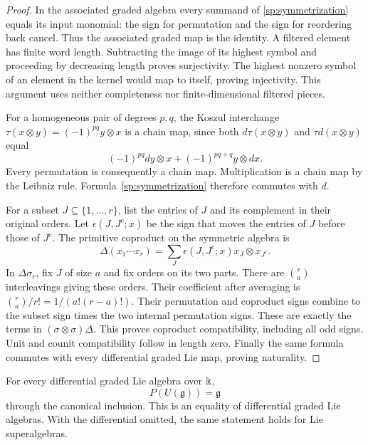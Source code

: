 \begin{proof}
In the associated graded algebra every summand of
\eqref{sp:symmetrization} equals its input monomial: the sign for
permutation and the sign for reordering back cancel.
Thus the associated graded map is the identity.  A filtered element
has finite word length.  Subtracting the image of its highest symbol
and proceeding by decreasing length proves surjectivity.
The highest nonzero symbol of an element in the kernel would map to
itself, proving injectivity.  This argument uses neither completeness
nor finite-dimensional filtered pieces.

For a homogeneous pair of degrees $p,q$, the Koszul interchange
$\tau(x\otimes y)=(-1)^{pq}y\otimes x$ is a chain map, since both
$d\tau(x\otimes y)$ and $\tau d(x\otimes y)$ equal
\[
 (-1)^{pq}dy\otimes x+(-1)^{pq+q}y\otimes dx.
\]
Every permutation is consequently a chain map.  Multiplication is a
chain map by the Leibniz rule.  Formula~\eqref{sp:symmetrization}
therefore commutes with $d$.

For a subset $J\subseteq\{1,\ldots,r\}$, list the entries of $J$
and its complement in their original orders.  Let $\epsilon(J,J^c;x)$
be the sign that moves the entries of $J$ before those of $J^c$.
The primitive coproduct on the symmetric algebra is
\[
 \Delta(x_1\cdots x_r)=
 \sum_J\epsilon(J,J^c;x)x_J\otimes x_{J^c}.
\]
In $\Delta\sigma_r$, fix $J$ of size $a$ and fix orders on its two
parts.  There are $\binom ra$ interleavings giving these orders.
Their coefficient after averaging is
$\binom ra/r!=1/(a!(r-a)!)$.
Their permutation and coproduct signs combine to the subset sign
times the two internal permutation signs.  These are exactly the
terms in $(\sigma\otimes\sigma)\Delta$.
This proves coproduct compatibility, including all odd signs.
Unit and counit compatibility follow in length zero.
Finally the same formula commutes with every differential graded Lie
map, proving naturality.
\end{proof}

\begin{theorem}
\label{sp:primitives}
For every differential graded Lie algebra over $\Bbbk$,
\[
 P(U(\mathfrak g))=\mathfrak g
\]
through the canonical inclusion.  This is an equality of differential
graded Lie algebras.  With the differential omitted, the same statement
holds for Lie superalgebras.
\end{theorem}

